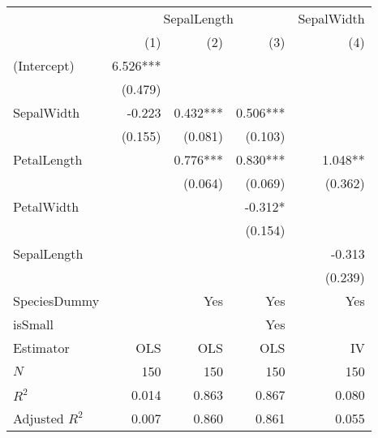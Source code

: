 \begin{tabular}{lrrrr}
\toprule
                          & \multicolumn{3}{c}{SepalLength} & \multicolumn{1}{c}{SepalWidth} \\ 
\cmidrule(lr){2-4} \cmidrule(lr){5-5} 
                          &      (1) &      (2) &       (3) &                            (4) \\ 
\midrule
(Intercept)               & 6.526*** &          &           &                                \\ 
                          &  (0.479) &          &           &                                \\ 
SepalWidth                &   -0.223 & 0.432*** &  0.506*** &                                \\ 
                          &  (0.155) &  (0.081) &   (0.103) &                                \\ 
PetalLength               &          & 0.776*** &  0.830*** &                        1.048** \\ 
                          &          &  (0.064) &   (0.069) &                        (0.362) \\ 
PetalWidth                &          &          &   -0.312* &                                \\ 
                          &          &          &   (0.154) &                                \\ 
SepalLength               &          &          &           &                         -0.313 \\ 
                          &          &          &           &                        (0.239) \\ 
\midrule
SpeciesDummy              &          &      Yes &       Yes &                            Yes \\ 
isSmall                   &          &          &       Yes &                                \\ 
\midrule
Estimator                 &      OLS &      OLS &       OLS &                             IV \\ 
\midrule
$N$                       &      150 &      150 &       150 &                            150 \\ 
$R^2$                     &    0.014 &    0.863 &     0.867 &                          0.080 \\ 
Adjusted $R^2$            &    0.007 &    0.860 &     0.861 &                          0.055 \\ 

\end{tabular}

